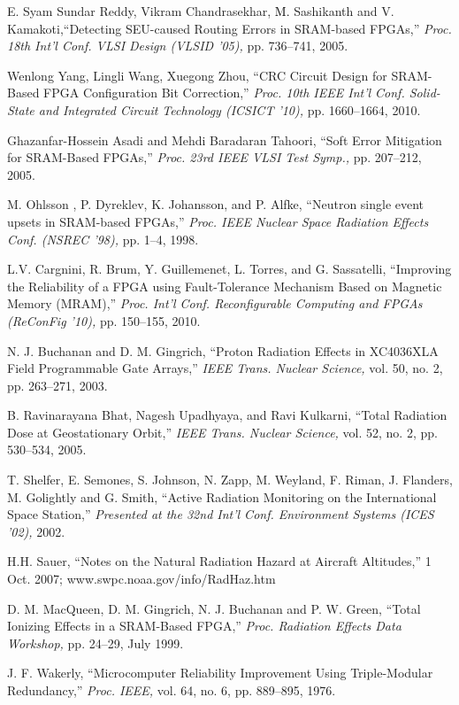 \documentclass[10pt,journal,cspaper,compsoc]{IEEEtran}
\begin{document}
{{\begin{thebibliography}{1}
E. Syam Sundar Reddy, Vikram Chandrasekhar, \textcolor{black}{M. }Sashikanth and V. Kamakoti,``Detecting SEU-caused Routing Errors in SRAM-based FPGAs,''  \textit{Proc. 18th Int'l Conf. VLSI Design (VLSID '05),} pp. 736--741, 2005.

Wenlong Yang, Lingli Wang, Xuegong Zhou, ``CRC Circuit Design for SRAM-Based FPGA Configuration Bit Correction,'' \textit{Proc. 10th IEEE Int'l Conf. Solid-State and Integrated Circuit Technology (ICSICT '10),} pp. 1660--1664, 2010.

Ghazanfar-Hossein Asadi and Mehdi Baradaran Tahoori, ``Soft Error Mitigation for SRAM-Based FPGAs,'' \textit{Proc. 23rd IEEE VLSI Test Symp.,} pp. 207--212, 2005.

M. Ohlsson , P. Dyreklev, K. Johansson, and P. Alfke, ``Neutron single event upsets in SRAM-based FPGAs,'' \textit{Proc. IEEE Nuclear Space Radiation Effects Conf. (NSREC '98),} pp. 1--4, 1998.


L.V. Cargnini, R. Brum, Y. Guillemenet, L. Torres, and G. Sassatelli, ``Improving the Reliability of a FPGA using Fault-Tolerance Mechanism Based on Magnetic Memory (MRAM),'' \textit{Proc. Int'l Conf. Reconfigurable Computing and FPGAs (ReConFig '10),} pp. 150--155, 2010.

N. J. Buchanan and D. M. Gingrich, ``Proton Radiation Effects in XC4036XLA Field Programmable Gate Arrays,'' \textit{IEEE Trans. Nuclear Science,} vol. 50, no. 2, pp. 263--271, 2003.

B. Ravinarayana Bhat, Nagesh Upadhyaya,
 and Ravi Kulkarni, ``Total Radiation Dose at Geostationary Orbit,'' \textit{IEEE Trans. Nuclear Science,} vol. 52, no. 2, pp. 530--534, 2005.

T. Shelfer, E. Semones, S. Johnson, N. Zapp, M. Weyland, F. Riman, J. Flanders, M. Golightly and G. Smith, ``Active Radiation Monitoring on the International Space Station,''
 \textit{Presented at the 32nd Int'l Conf. Environment Systems (ICES '02),} 2002.

H.H. Sauer, ``Notes on the Natural Radiation Hazard at Aircraft Altitudes,'' 1 Oct. 2007; www.swpc.noaa.gov/info/RadHaz.htm

D. M. MacQueen, D. M. Gingrich, N. J. Buchanan and P. W. Green, ``Total Ionizing Effects in a SRAM-Based FPGA,''  \textit{Proc. Radiation Effects Data Workshop,} pp. 24--29, July 1999.

J. F. Wakerly, ``Microcomputer Reliability  Improvement  Using Triple-Modular Redundancy,'' \textit{Proc. IEEE,} vol. 64, no. 6, pp. 889--895, 1976.


\end{thebibliography}}}
\end{document}
